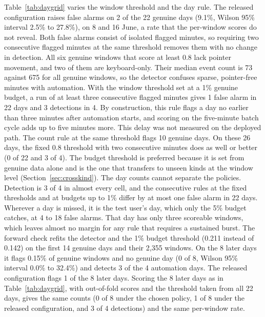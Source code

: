 \documentclass[sensors,article,submit,pdftex,oneauthor]{Definitions/mdpi}
\begin{document}
Table~\ref{tab:daygrid} varies the window threshold and the day rule. The released configuration raises false alarms on 2 of the 22 genuine days (9.1\%, Wilson 95\% interval 2.5\% to 27.8\%), on 8 and 16 June, a rate that the per-window scores do not reveal. Both false alarms consist of isolated flagged minutes, so requiring two consecutive flagged minutes at the same threshold removes them with no change in detection. All six genuine windows that score at least 0.8 lack pointer movement, and two of them are keyboard-only. Their median event count is 73 against 675 for all genuine windows, so the detector confuses sparse, pointer-free minutes with automation. With the window threshold set at a 1\% genuine budget, a run of at least three consecutive flagged minutes gives 1 false alarm in 22 days and 3 detections in 4. By construction, this rule flags a day no earlier than three minutes after automation starts, and scoring on the five-minute batch cycle adds up to five minutes more. This delay was not measured on the deployed path. The count rule at the same threshold flags 10 genuine days. On these 26 days, the fixed 0.8 threshold with two consecutive minutes does as well or better (0 of 22 and 3 of 4). The budget threshold is preferred because it is set from genuine data alone and is the one that transfers to unseen kinds at the window level (Section~\ref{sec:crosskind}). The day counts cannot separate the policies. Detection is 3 of 4 in almost every cell, and the consecutive rules at the fixed thresholds and at budgets up to 1\% differ by at most one false alarm in 22 days. Wherever a day is missed, it is the test user's day, which only the 5\% budget catches, at 4 to 18 false alarms. That day has only three scoreable windows, which leaves almost no margin for any rule that requires a sustained burst. The forward check refits the detector and the 1\% budget threshold (0.211 instead of 0.142) on the first 14 genuine days and their 2,355 windows. On the 8 later days it flags 0.15\% of genuine windows and no genuine day (0 of 8, Wilson 95\% interval 0.0\% to 32.4\%) and detects 3 of the 4 automation days. The released configuration flags 1 of the 8 later days. Scoring the 8 later days as in Table~\ref{tab:daygrid}, with out-of-fold scores and the threshold taken from all 22 days, gives the same counts (0 of 8 under the chosen policy, 1 of 8 under the released configuration, and 3 of 4 detections) and the same per-window rate.




\end{document}
